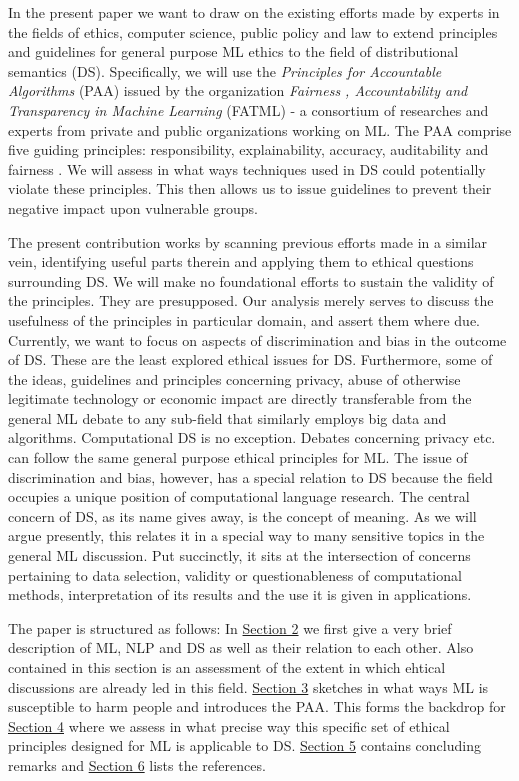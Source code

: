 \documentclass{article}
\begin{document}
In the present paper we want to draw on the existing efforts made by experts in the fields of ethics, computer science, public policy and law to extend principles  and guidelines for general purpose ML ethics to the field of distributional semantics (DS). Specifically, we will use the \emph{Principles for Accountable Algorithms} (PAA) issued by the organization \emph{Fairness , Accountability and Transparency in Machine Learning} (FATML) - a consortium of researches and experts from private and public organizations working on ML. 
The PAA comprise five guiding principles: responsibility, explainability, accuracy, auditability and fairness \cite{principles}.
We will assess in what ways techniques used in DS could potentially violate these principles. This then allows us to issue guidelines to prevent their negative impact upon vulnerable groups. 

The present contribution works by scanning previous efforts made in a similar vein, identifying useful parts therein and applying them to ethical questions surrounding DS. We will make no foundational efforts to sustain the validity of the principles. They are presupposed. Our analysis merely serves to discuss the usefulness of the principles in particular domain, and assert them where due.
Currently, we want to focus on aspects of discrimination and bias in the outcome of DS. These are the least explored ethical issues for DS. Furthermore, some of the ideas, guidelines and principles concerning privacy, abuse of otherwise legitimate technology or economic impact are directly transferable from the general ML debate to any sub-field that similarly employs big data and algorithms. Computational DS is no exception. Debates concerning privacy etc. can follow the same general purpose ethical principles for ML. The issue of discrimination and bias, however, has a special relation to DS because the field occupies a unique position of computational language research. The central concern of DS, as its name gives away, is the concept of meaning. As we will argue presently, this relates it in a special way to many sensitive topics in the general ML discussion. Put succinctly, it sits at the intersection of concerns pertaining to data selection, validity or questionableness of computational methods, interpretation of its results and the use it is given in applications.

The paper is structured as follows: In \hyperlink{sec2}{Section 2} we first give a very brief description of ML, NLP and DS as well as their relation to each other. Also contained in this section is an assessment of the extent in which ehtical discussions are already led in this field. \hyperlink{sec3}{Section 3} sketches in what ways ML is susceptible to harm people and introduces the PAA. This forms the backdrop for \hyperlink{sec4}{Section 4} where we assess in what precise way this specific set of ethical principles designed for ML is applicable to DS. \hyperlink{sec5}{Section 5} contains concluding remarks and \hyperlink{sec6}{Section 6} lists the references.
\end{document}
